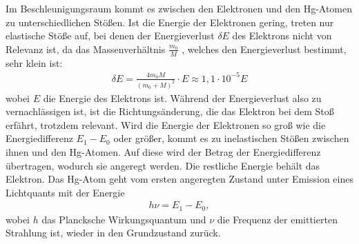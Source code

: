 Im Beschleunigungsraum kommt es zwischen den Elektronen und den Hg-Atomen zu
unterschiedlichen Stößen. Ist die Energie der Elektronen gering, treten nur elastische Stöße
auf, bei denen der Energieverlust $\delta E$ des Elektrons nicht von Relevanz ist, da das
Massenverhältnis $\frac{m_\text{0}}{M}$ , welches den Energieverlust bestimmt, sehr klein ist:
\begin{align*}
\delta E = \frac{4 m_\text{0} M}{(m_\text{0} + M)^{2}} \cdot E \approx 1,1 \cdot 10^{-5} E
\end{align*}
wobei $E$ die Energie des Elektrons ist. Während der Energieverlust also zu vernachlässigen ist, 
ist die Richtungsänderung, die das Elektron bei dem Stoß erfährt, trotzdem
relevant. 
Wird die Energie der Elektronen so groß wie die Energiedifferenz
$E_\text{1} - E_\text{0}$ oder größer, kommt es zu inelastischen Stößen zwischen ihnen und den
Hg-Atomen. Auf diese wird der Betrag der Energiedifferenz übertragen, wodurch
sie angeregt werden. Die restliche Energie behält das Elektron. Das Hg-Atom geht vom
ersten angeregten Zustand unter Emission eines Lichtquants mit der Energie 
\begin{align}
h \nu = E_\text{1} - E_\text{0},
\end{align}
wobei $h$ das Plancksche Wirkungsquantum und $\nu$ die Frequenz der emittierten Strahlung
ist, wieder in den Grundzustand zurück.

